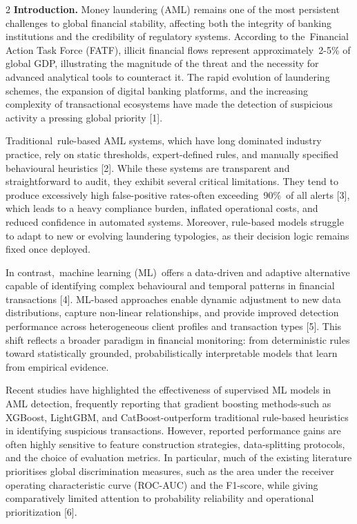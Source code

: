 \begin{multicols}{2}
{\bfseries Introduction.} Money laundering (AML) remains one of the most
persistent challenges to global financial stability, affecting both the
integrity of banking institutions and the credibility of regulatory
systems. According to the~Financial Action Task Force (FATF),
illicit financial flows represent approximately~2-5\% of global
GDP, illustrating the magnitude of the threat and the necessity
for advanced analytical tools to counteract it. The rapid evolution of
laundering schemes, the expansion of digital banking platforms, and the
increasing complexity of transactional ecosystems have made the
detection of suspicious activity a pressing global priority {[}1{]}.

Traditional~rule-based AML systems, which have long dominated industry
practice, rely on static thresholds, expert-defined rules, and manually
specified behavioural heuristics {[}2{]}. While these systems are
transparent and straightforward to audit, they exhibit several critical
limitations. They tend to produce excessively high false-positive
rates-often exceeding~90\%~of all alerts {[}3{]}, which leads to a heavy
compliance burden, inflated operational costs, and reduced confidence in
automated systems. Moreover, rule-based models struggle to adapt to new
or evolving laundering typologies, as their decision logic remains fixed
once deployed.

In contrast,~machine learning (ML)~offers a data-driven and adaptive
alternative capable of identifying complex behavioural and temporal
patterns in financial transactions {[}4{]}. ML-based approaches enable
dynamic adjustment to new data distributions, capture non-linear
relationships, and provide improved detection performance across
heterogeneous client profiles and transaction types {[}5{]}. This shift
reflects a broader paradigm in financial monitoring: from deterministic
rules toward statistically grounded, probabilistically interpretable
models that learn from empirical evidence.

Recent studies have highlighted the effectiveness of supervised ML
models in AML detection, frequently reporting that gradient boosting
methods-such as XGBoost, LightGBM, and CatBoost-outperform traditional
rule-based heuristics in identifying suspicious transactions. However,
reported performance gains are often highly sensitive to feature
construction strategies, data-splitting protocols, and the choice of
evaluation metrics. In particular, much of the existing literature
prioritises global discrimination measures, such as the area under the
receiver operating characteristic curve (ROC-AUC) and the F1-score,
while giving comparatively limited attention to probability reliability
and operational prioritization {[}6{]}.


\end{multicols}
